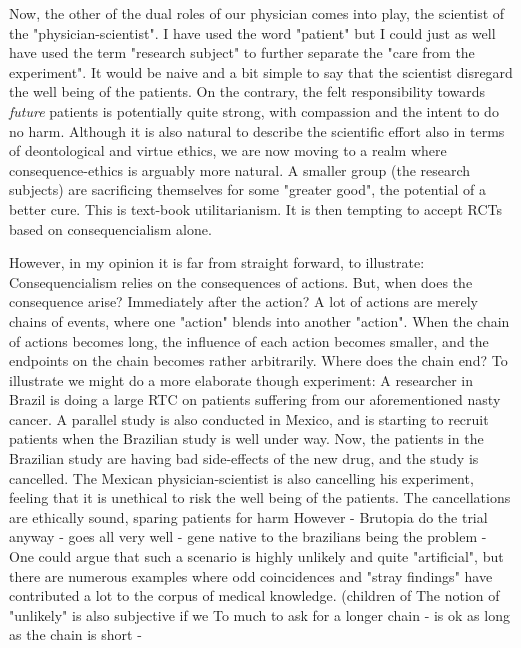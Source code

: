 \documentclass[12p]{article}
\begin{document}
Now, the other of the dual roles of our physician comes into play, the scientist of the "physician-scientist".
I have used the word "patient" but I could just as well have used the term "research subject" to further separate the "care from the experiment".
It would be naive and a bit simple to say that the scientist disregard the well being of the patients.
On the contrary, the felt responsibility towards \emph{future} patients is potentially quite strong, with compassion and the intent to do no harm.
Although it is also natural to describe the scientific effort also in terms of deontological and virtue ethics, we are now moving to a realm where consequence-ethics is arguably more natural.
A smaller group (the research subjects) are sacrificing themselves for some "greater good", the potential of a better cure.
This is text-book utilitarianism.%
It is then tempting to accept RCTs based on consequencialism alone.

However, in my opinion it is far from straight forward, to illustrate:
Consequencialism relies on the consequences of actions.
But, when does the consequence arise?
Immediately after the action?
A lot of actions are merely chains of events, where one "action" blends into another "action".
When the chain of actions becomes long, the influence of each action becomes smaller, and the endpoints on the chain becomes rather arbitrarily.
Where does the chain end?
To illustrate we might do a more elaborate though experiment:
A researcher in Brazil is doing a large RTC on patients suffering from our aforementioned nasty cancer.
A parallel study is also conducted in Mexico, and is starting to recruit patients when the Brazilian study is well under way.
Now, the patients in the Brazilian study are having bad side-effects of the new drug, and the study is cancelled.
The Mexican physician-scientist is also cancelling his experiment, feeling that it is unethical to risk the well being of the patients.
The cancellations are ethically sound, sparing patients for harm 
However - Brutopia do the trial anyway - goes all very well - gene native to the brazilians being the problem - 
One could argue that such a scenario is highly unlikely and quite "artificial", but there are numerous examples where odd coincidences and "stray findings" have contributed a lot to the corpus of medical knowledge. (children of 
The notion of "unlikely" is also subjective if we 
To much to ask for a longer chain - is ok as long as the chain is short -
\end{document}
